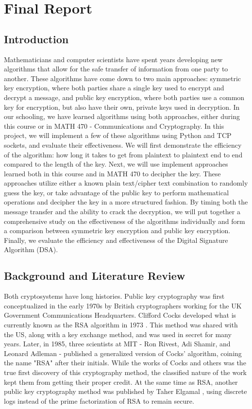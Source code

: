 \documentclass[12pt]{report}
\begin{document}
\chapter{Final Report}
\section{Introduction}
Mathematicians and computer scientists have spent years developing new algorithms that allow for the safe transfer of information from one party to another.
These algorithms have come down to two main approaches: symmetric key encryption, where both parties share a single key used to encrypt and decrypt a message,
and public key encryption, where both parties use a common key for encryption, but also have their own, private keys used in decryption. In our schooling, we
have learned algorithms using both approaches, either during this course or in MATH 470 - Communications and Cryptography. In this project, we will implement a few
of these algorithms using Python and TCP sockets, and evaluate their effectiveness. We will first demonstrate the efficiency of the algorithm: how long it
takes to get from plaintext to plaintext end to end compared to the length of the key. Next, we will use implement approaches learned both in this course and
in MATH 470 to decipher the key. These approaches utilize either a known plain text/cipher text combination to randomly guess the key, or take advantage of the public
key to perform mathematical operations and decipher the key in a more structured fashion. By timing both the message transfer and the ability to crack the
decryption, we will put together a comprehensive study on the effectiveness of the algorithms individually and form a comparison between symmetric key encryption
and public key encryption. Finally, we evaluate the efficiency and effectiveness of the Digital Signature Algorithm (DSA).

\section{Background and Literature Review}
Both cryptosystems have long histories. Public key cryptography was first conceptualized in the early 1970s by British cryptographers working for the UK Government Communications Headquarters.
Clifford Cocks developed what is currently known as the RSA algorithm in 1973 \cite{class}. This method was shared with the US, along with a key exchange method, and was used in secret for many years.
Later, in 1985, three scientists at MIT - Ron Rivest, Adi Shamir, and Leonard Adleman - published a generalized version of Cocks' algorithm, coining the name "RSA" after their initials. While the
works of Cocks and others was the true first discovery of this cryptography method, the classified nature of the work kept them from getting their proper credit. At the same time as RSA, another
public key cryptography method was published by Taher Elgamal \cite{elgamal}, using discrete logs instead of the prime factorization of RSA to remain secure.
\end{document}
